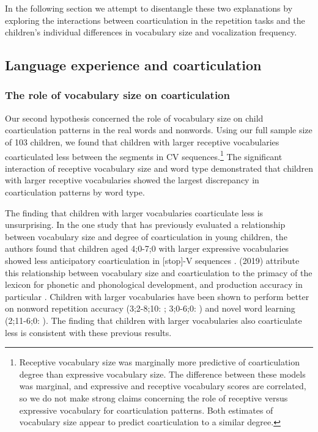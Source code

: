 \documentclass[a4paper,man,natbib,donotrepeattitle, apacite]{apa6}
\begin{document}
In the following section we attempt to disentangle these two explanations by exploring the interactions between coarticulation in the repetition tasks and the children’s individual differences in vocabulary size and vocalization frequency. 

\subsection{Language experience and coarticulation}

\subsubsection{The role of vocabulary size on coarticulation}

Our second hypothesis concerned the role of vocabulary size on child coarticulation patterns in the real words and nonwords. Using our full sample size of 103 children, we found that children with larger receptive vocabularies coarticulated less between the segments in CV sequences.\footnote{Receptive vocabulary size was marginally more predictive of coarticulation degree than expressive vocabulary size. The difference between these models was marginal, and expressive and receptive vocabulary scores are correlated, so we do not make strong claims concerning the role of receptive versus expressive vocabulary for coarticulation patterns. Both estimates of vocabulary size appear to predict coarticulation to a similar degree.} The significant interaction of receptive vocabulary size and word type demonstrated that children with larger receptive vocabularies showed the largest discrepancy in coarticulation patterns by word type. 

The finding that children with larger vocabularies coarticulate less is unsurprising. In the one study that has previously evaluated a relationship between vocabulary size and degree of coarticulation in young children, the authors found that children aged 4;0-7;0 with larger expressive vocabularies showed less anticipatory coarticulation in [stop]-V sequences \cite{noiraySpokenLanguageDevelopment2019}. \citeauthor{noiraySpokenLanguageDevelopment2019} (2019) attribute this relationship between vocabulary size and coarticulation to the primacy of the lexicon for phonetic and phonological development, and production accuracy in particular \cite{beckmanGeneralizingLexiconsPredict2010,edwardsInteractionVocabularySize2004,metsalaYoungChildrenPhonological1999,metsalaSpokenVocabularyGrowth1998,storkelInfluencePartwordPhonotactic2011,storkelLexiconPhonologyInteractions2002}. Children with larger vocabularies have been shown to perform better on nonword repetition accuracy (3;2-8;10: ; 3;0-6;0: ) and novel word learning (2;11-6;0: ). The finding that children with larger vocabularies also coarticulate less is consistent with these previous results. 
\end{document}
